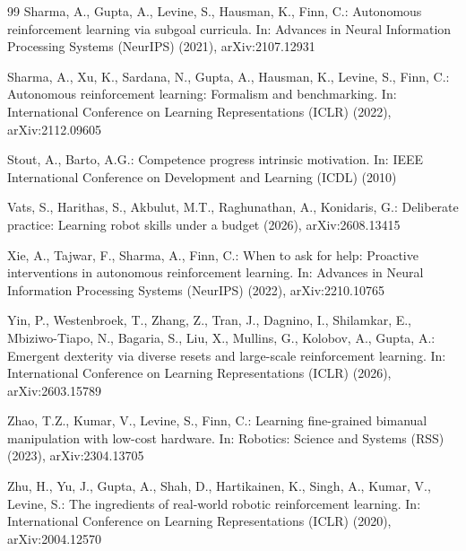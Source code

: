\documentclass[runningheads]{llncs}
\begin{document}
\begin{thebibliography}{99}
Sharma, A., Gupta, A., Levine, S., Hausman, K., Finn, C.: Autonomous reinforcement learning via subgoal curricula. In: Advances in Neural Information Processing Systems (NeurIPS) (2021), arXiv:2107.12931

Sharma, A., Xu, K., Sardana, N., Gupta, A., Hausman, K., Levine, S., Finn, C.: Autonomous reinforcement learning: Formalism and benchmarking. In: International Conference on Learning Representations (ICLR) (2022), arXiv:2112.09605

Stout, A., Barto, A.G.: Competence progress intrinsic motivation. In: IEEE International Conference on Development and Learning (ICDL) (2010)

Vats, S., Harithas, S., Akbulut, M.T., Raghunathan, A., Konidaris, G.: Deliberate practice: Learning robot skills under a budget (2026), arXiv:2608.13415

Xie, A., Tajwar, F., Sharma, A., Finn, C.: When to ask for help: Proactive interventions in autonomous reinforcement learning. In: Advances in Neural Information Processing Systems (NeurIPS) (2022), arXiv:2210.10765

Yin, P., Westenbroek, T., Zhang, Z., Tran, J., Dagnino, I., Shilamkar, E., Mbiziwo-Tiapo, N., Bagaria, S., Liu, X., Mullins, G., Kolobov, A., Gupta, A.: Emergent dexterity via diverse resets and large-scale reinforcement learning. In: International Conference on Learning Representations (ICLR) (2026), arXiv:2603.15789

Zhao, T.Z., Kumar, V., Levine, S., Finn, C.: Learning fine-grained bimanual manipulation with low-cost hardware. In: Robotics: Science and Systems (RSS) (2023), arXiv:2304.13705

Zhu, H., Yu, J., Gupta, A., Shah, D., Hartikainen, K., Singh, A., Kumar, V., Levine, S.: The ingredients of real-world robotic reinforcement learning. In: International Conference on Learning Representations (ICLR) (2020), arXiv:2004.12570

\end{thebibliography}
\end{document}

